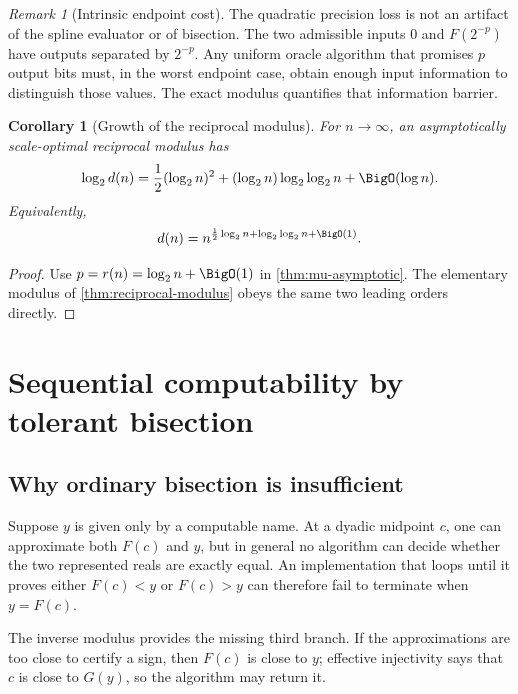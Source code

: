 \documentclass[11pt,oneside]{article}
\newtheorem{corollary}[theorem]{Corollary}
\theoremstyle{definition}
\theoremstyle{remark}
\newtheorem{remark}[theorem]{Remark}
\numberwithin{equation}{section}
\begin{document}
\begin{remark}[Intrinsic endpoint cost]
The quadratic precision loss is not an artifact of the spline evaluator or of
bisection.  The two admissible inputs $0$ and $F(2^{-p})$ have outputs separated
by $2^{-p}$.  Any uniform oracle algorithm that promises $p$ output bits must,
in the worst endpoint case, obtain enough input information to distinguish
those values.  The exact modulus quantifies that information barrier.
\end{remark}

\begin{corollary}[Growth of the reciprocal modulus]\label{cor:d-growth}
For $n\to\infty$, an asymptotically scale-optimal reciprocal modulus has
\begin{equation}\label{eq:d-growth}
 \log_2 d(n)
 =\frac12(\log_2 n)^2
  +(\log_2n)\log_2\log_2n
  +\BigO(\log n).
\end{equation}
Equivalently,
\begin{equation}\label{eq:d-quasipoly}
 d(n)=n^{\frac12\log_2n+\log_2\log_2n+\BigO(1)}.
\end{equation}
\end{corollary}

\begin{proof}
Use $p=r(n)=\log_2n+\BigO(1)$ in
\cref{thm:mu-asymptotic}.  The elementary modulus of
\cref{thm:reciprocal-modulus} obeys the same two leading orders directly.
\end{proof}

\section{Sequential computability by tolerant bisection}
\label{sec:sequential}

\subsection{Why ordinary bisection is insufficient}

Suppose $y$ is given only by a computable name.  At a dyadic midpoint $c$,
one can approximate both $F(c)$ and $y$, but in general no algorithm can
decide whether the two represented reals are exactly equal.  An implementation
that loops until it proves either $F(c)<y$ or $F(c)>y$ can therefore fail to
terminate when $y=F(c)$.

The inverse modulus provides the missing third branch.  If the approximations
are too close to certify a sign, then $F(c)$ is close to $y$; effective
injectivity says that $c$ is close to $G(y)$, so the algorithm may return it.
\end{document}
